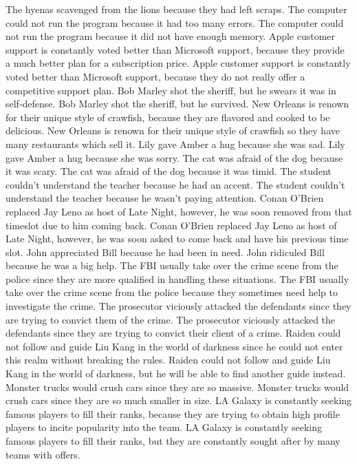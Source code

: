 \documentclass{article}
\begin{document}
\begin{enumerate}
The hyenas scavenged from the lions because they had left scraps.
The computer could not run the program because it had too many errors.
The computer could not run the program because it did not have enough memory.
Apple customer support is constantly voted better than Microsoft support, because they provide a much better plan for a subscription price.
Apple customer support is constantly voted better than Microsoft support, because they do not really offer a competitive support plan.
Bob Marley shot the sheriff, but he swears it was in self-defense.
Bob Marley shot the sheriff, but he survived.
New Orleans is renown for their unique style of crawfish, because they are flavored and cooked to be delicious.
New Orleans is renown for their unique style of crawfish so they have many restaurants which sell it.
Lily gave Amber a hug because she was sad.
Lily gave Amber a hug because she was sorry.
The cat was afraid of the dog because it was scary.
The cat was afraid of the dog because it was timid.
The student couldn't understand the teacher because he had an accent.
The student couldn't understand the teacher because he wasn't paying attention.
Conan O'Brien replaced Jay Leno as host of Late Night, however, he was soon removed from that timeslot due to him coming back.
Conan O'Brien replaced Jay Leno as host of Late Night, however, he was soon asked to come back and have his previous time slot.
John appreciated Bill because he had been in need.
John ridiculed Bill because he was a big help.
The FBI usually take over the crime scene from the police since they are more qualified in handling these situations.
The FBI usually take over the crime scene from the police because they sometimes need help to investigate the crime.
The prosecutor viciously attacked the defendants since they are trying to convict them of the crime.
The prosecutor viciously attacked the defendants since they are trying to convict their client of a crime.
Raiden could not follow and guide Liu Kang in the world of darkness since he could not enter this realm without breaking the rules.
Raiden could not follow and guide Liu Kang in the world of darkness, but he will be able to find another guide instead.
Monster trucks would crush cars since they are so massive.
Monster trucks would crush cars since they are so much smaller in size.
LA Galaxy is constantly seeking famous players to fill their ranks, because they are trying to obtain high profile players to incite popularity into the team.
LA Galaxy is constantly seeking famous players to fill their ranks, but they are constantly sought after by many teams with offers.

\end{enumerate}
\end{document}
